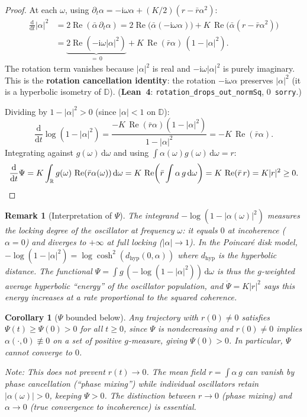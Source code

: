 \documentclass[11pt,a4paper]{article}
\newtheorem{corollary}[theorem]{Corollary}
\newtheorem{remark}[theorem]{Remark}
\theoremstyle{definition}
\DeclareMathOperator{\re}{Re}
\newcommand{\D}{\mathbb{D}}
\newcommand{\R}{\mathbb{R}}
\begin{document}
\begin{proof}
At each $\omega$, using $\partial_t\alpha = -\mathrm{i}\omega\alpha + (K/2)(r - \bar{r}\alpha^2)$:
\begin{align*}
\frac{\mathrm{d}}{\mathrm{d}t}|\alpha|^2 &= 2\re(\bar{\alpha}\,\partial_t\alpha) = 2\re\!\big(\bar{\alpha}(-\mathrm{i}\omega\alpha)\big) + K\,\re\!\big(\bar{\alpha}(r - \bar{r}\alpha^2)\big) \\
&= \underbrace{2\re(-\mathrm{i}\omega|\alpha|^2)}_{=\,0} + K\,\re(\bar{r}\alpha)\,(1 - |\alpha|^2).
\end{align*}
The rotation term vanishes because $|\alpha|^2$ is real and $-\mathrm{i}\omega|\alpha|^2$ is purely imaginary. This is the \textbf{rotation cancellation identity}: the rotation $-\mathrm{i}\omega\alpha$ preserves $|\alpha|^2$ (it is a hyperbolic isometry of $\D$). (\textbf{Lean~4}: \texttt{rotation\_drops\_out\_normSq}, 0~\texttt{sorry}.)

Dividing by $1 - |\alpha|^2 > 0$ (since $|\alpha| < 1$ on $\D$):
\[
\frac{\mathrm{d}}{\mathrm{d}t}\log(1 - |\alpha|^2) = \frac{-K\,\re(\bar{r}\alpha)(1-|\alpha|^2)}{1-|\alpha|^2} = -K\,\re(\bar{r}\alpha).
\]
Integrating against $g(\omega)\,\mathrm{d}\omega$ and using $\int\alpha(\omega)g(\omega)\,\mathrm{d}\omega = r$:
\[
\frac{\mathrm{d}}{\mathrm{d}t}\Psi = K\int_\R g(\omega)\,\re(\bar{r}\alpha(\omega))\,\mathrm{d}\omega = K\,\re\!\left(\bar{r}\int\alpha\,g\,\mathrm{d}\omega\right) = K\,\re(\bar{r}\,r) = K|r|^2 \geq 0. \qedhere
\]
\end{proof}

\begin{remark}[Interpretation of $\Psi$]
The integrand $-\log(1-|\alpha(\omega)|^2)$ measures the \emph{locking degree} of the oscillator at frequency $\omega$: it equals $0$ at incoherence ($\alpha = 0$) and diverges to $+\infty$ at full locking ($|\alpha| \to 1$). In the Poincar\'e disk model, $-\log(1-|\alpha|^2) = \log\cosh^2(d_{\mathrm{hyp}}(0,\alpha))$ where $d_{\mathrm{hyp}}$ is the hyperbolic distance. The functional $\Psi = \int g\,(-\log(1-|\alpha|^2))\,\mathrm{d}\omega$ is thus the $g$-weighted average hyperbolic ``energy'' of the oscillator population, and $\dot\Psi = K|r|^2$ says this energy increases at a rate proportional to the squared coherence.
\end{remark}

\begin{corollary}[$\Psi$ bounded below]\label{cor:no-incoherence}
Any trajectory with $r(0) \neq 0$ satisfies $\Psi(t) \geq \Psi(0) > 0$ for all $t \geq 0$, since $\Psi$ is nondecreasing and $r(0) \neq 0$ implies $\alpha(\cdot, 0) \not\equiv 0$ on a set of positive $g$-measure, giving $\Psi(0) > 0$. In particular, $\Psi$ cannot converge to $0$.

\emph{Note}: This does not prevent $r(t) \to 0$. The mean field $r = \int\alpha\,g$ can vanish by phase cancellation (``phase mixing'') while individual oscillators retain $|\alpha(\omega)| > 0$, keeping $\Psi > 0$. The distinction between $r \to 0$ (phase mixing) and $\alpha \to 0$ (true convergence to incoherence) is essential.
\end{corollary}
\end{document}
